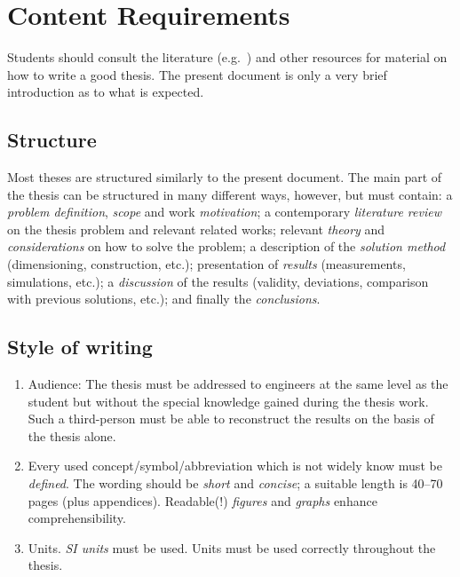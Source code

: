 
\chapter{Content Requirements}\label{ch:content}

Students should consult the literature
(e.g.~\cite{Sid99,StrWhi79,Coo64,wrise16,Wol16})
and other resources for material on how to write a good
thesis.  The present document is only a very brief introduction as to what
is expected.

\nocite{NieLeh03,HasLehKwo05}

\section{Structure}
Most theses are structured similarly to the present document.
The main part of the thesis can be structured in many different ways,
however, but must contain: a \emph{problem definition}, \emph{scope}
and work \emph{motivation};
a contemporary \emph{literature review} on the thesis problem and relevant
related works;
relevant \emph{theory} and \emph{considerations} on how to solve the problem;
a description of the \emph{solution method} (dimensioning, construction,
etc.);
presentation of \emph{results} (measurements, simulations, etc.);
a \emph{discussion} of the results (validity, deviations, comparison
with previous solutions, etc.); and finally the \emph{conclusions}.

\section{Style of writing}

\begin{enumerate}

\item Audience:
The thesis must be addressed to engineers at the same level as the
student but without the special knowledge gained during the thesis work.
Such a third-person must be able to reconstruct the results on the basis
of the thesis alone.

\item
Every used concept/symbol/abbreviation which is not widely know must be \emph{defined}.
The wording should be \emph{short} and \emph{concise};  a suitable length
is 40--70 pages (plus appendices).
Readable(!) \emph{figures} and \emph{graphs} enhance comprehensibility.

\item Units.
\emph{SI units} must be used.  Units must be used correctly throughout the
thesis.
\end{enumerate}

